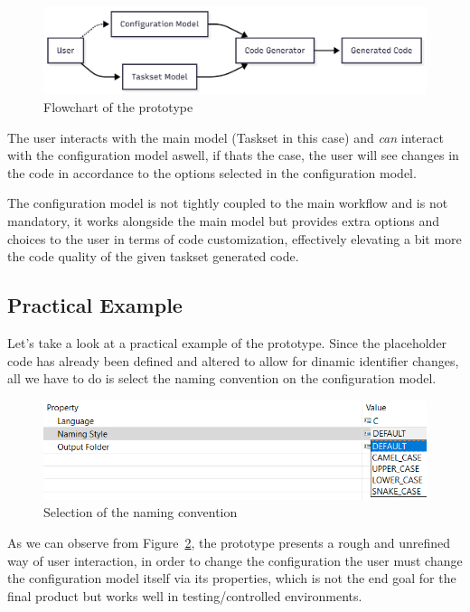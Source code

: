 \begin{figure}[htbp]
	\centering
	\includegraphics[height=0.22\textwidth]{prototype_flowchart.png}
	\caption{Flowchart of the prototype}
	\label{fig:prototype_flowchart}
\end{figure}

The user interacts with the main model (Taskset in this case) and \textit{can} interact with the configuration model aswell, if thats the case, the user will see changes in the code in accordance to the options selected in the configuration model.

The configuration model is not tightly coupled to the main workflow and is not mandatory, it works alongside the main model but provides extra options and choices to the user in terms of code customization, effectively elevating a bit more the code quality of the given taskset generated code.

\subsection{Practical Example}
\label{sec:practical_example}
 
Let's take a look at a practical example of the prototype. Since the placeholder code has already been defined and altered to allow for dinamic \gls{identifier} changes, all we have to do is select the naming convention on the configuration model.

\begin{figure}[htbp]
	\centering
	\includegraphics[height=0.22\textwidth]{naming_convention_selection.png}
	\caption{Selection of the naming convention}
	\label{fig:prototype_selection}
\end{figure}

As we can observe from Figure~\ref{fig:prototype_selection}, the prototype presents a rough and unrefined way of user interaction, in order to change the configuration the user must change the configuration model itself via its properties, which is not the end goal for the final product but works well in testing/controlled environments. 

